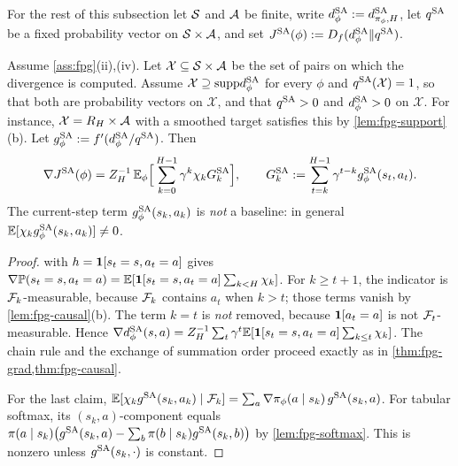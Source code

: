 For the rest of this subsection let $\mathcal{S}$ and $\mathcal{A}$ be finite, write $d^{\mathrm{SA}}_\phi:=d^{\mathrm{SA}}_{\pi_\phi,H}$, let $q^{\mathrm{SA}}$ be a fixed probability vector on $\mathcal{S}\times\mathcal{A}$, and set $J^{\mathrm{SA}}(\phi):=D_f(d^{\mathrm{SA}}_\phi\Vert q^{\mathrm{SA}})$.

\begin{proposition}\label{prop:fpg-sa}
Assume \cref{ass:fpg}(ii),(iv). Let $\mathcal X\subseteq\mathcal{S}\times\mathcal{A}$ be the set of pairs on which the divergence is computed.
Assume $\mathcal X\supseteq\mathrm{supp} d^{\mathrm{SA}}_\phi$ for every $\phi$ and $q^{\mathrm{SA}}(\mathcal X)=1$, so that both are probability vectors on $\mathcal X$, and that $q^{\mathrm{SA}}>0$ and $d^{\mathrm{SA}}_\phi>0$ on $\mathcal X$.
For instance, $\mathcal X=R_H\times\mathcal{A}$ with a smoothed target satisfies this by \cref{lem:fpg-support}(b).
Let $g^{\mathrm{SA}}_\phi:=f'(d^{\mathrm{SA}}_\phi/q^{\mathrm{SA}})$. Then
\[
\nabla J^{\mathrm{SA}}(\phi)=Z_H^{-1}\,\mathbb{E}_\phi\Big[\sum_{k=0}^{H-1}\gamma^k\chi_kG^{\mathrm{SA}}_k\Big],\qquad
G^{\mathrm{SA}}_k:=\sum_{t=k}^{H-1}\gamma^{t-k}g^{\mathrm{SA}}_\phi(s_t,a_t).
\]
The current-step term $g^{\mathrm{SA}}_\phi(s_k,a_k)$ is \emph{not} a baseline: in general $\mathbb{E}[\chi_kg^{\mathrm{SA}}_\phi(s_k,a_k)]\ne0$.
\end{proposition}
\begin{proof}
 with $h=\mathbf{1}[s_t=s,a_t=a]$ gives $\nabla\mathbb{P}(s_t=s,a_t=a)=\mathbb{E}[\mathbf{1}[s_t=s,a_t=a]\sum_{k<H}\chi_k]$.
For $k\ge t+1$, the indicator is $\mathcal{F}_k$-measurable, because $\mathcal{F}_k$ contains $a_t$ when $k>t$; those terms vanish by \cref{lem:fpg-causal}(b).
The term $k=t$ is \emph{not} removed, because $\mathbf{1}[a_t=a]$ is not $\mathcal{F}_t$-measurable.
Hence $\nabla d^{\mathrm{SA}}_\phi(s,a)=Z_H^{-1}\sum_t\gamma^t\mathbb{E}[\mathbf{1}[s_t=s,a_t=a]\sum_{k\le t}\chi_k]$.
The chain rule and the exchange of summation order proceed exactly as in \cref{thm:fpg-grad,thm:fpg-causal}.

For the last claim, $\mathbb{E}[\chi_kg^{\mathrm{SA}}(s_k,a_k)\mid\mathcal{F}_k]=\sum_a\nabla\pi_\phi(a\mid s_k)\,g^{\mathrm{SA}}(s_k,a)$.
For tabular softmax, its $(s_k,a)$-component equals $\pi(a\mid s_k)\big(g^{\mathrm{SA}}(s_k,a)-\sum_b\pi(b\mid s_k)g^{\mathrm{SA}}(s_k,b)\big)$ by \cref{lem:fpg-softmax}. This is nonzero unless $g^{\mathrm{SA}}(s_k,\cdot)$ is constant.
\end{proof}

